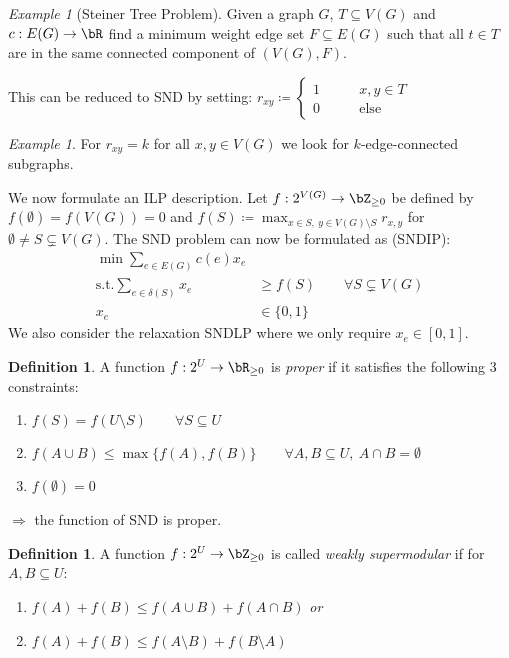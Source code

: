 \documentclass[11pt, a4paper]{article}
\newcommand{\set}[1]{\{#1\}}
\theoremstyle{remark}
\newtheorem{nexample}[theorem]{Example}
\theoremstyle{definition}
\newtheorem{definition}[theorem]{Definition}
\begin{document}
\begin{nexample}[Steiner Tree Problem]
	Given a graph $G$, $T\subseteq V(G)$ and $c: E(G)\to\bR$ find a minimum
	weight edge set $F\subseteq E(G)$ such that all $t\in T$ are in the same
	connected component of $(V(G), F)$.

	This can be reduced to SND by setting: $r_{xy}\coloneqq\begin{cases}
			1 \qquad & x,y\in T    \\
			0 \qquad & \text{else}
		\end{cases}$
\end{nexample}

\begin{nexample}
	For $r_{xy}=k$ for all $x,y\in V(G)$ we look for $k$-edge-connected
	subgraphs.
\end{nexample}

We now formulate an ILP description. Let $f: 2^{V(G)}\to\bZ_{\geq0}$
be defined by $f(\emptyset)=f(V(G))=0$ and $f(S)\coloneqq \max_{x\in
		S,\ y\in V(G) \setminus S}r_{x,y}$ for $\emptyset\neq S\subsetneq
	V(G)$. The SND problem can now be formulated as (SNDIP):
\begin{align*}
	\min\sum_{e\in E(G)}c(e)x_e                                                     \\
	\text{s.t.} \sum_{e\in\delta(S)}x_e & \geq f(S) \qquad \forall S\subsetneq V(G) \\
	x_e                                 & \in\set{0,1}
\end{align*}
We also consider the relaxation SNDLP where we only require $x_e\in[0,1]$.

\begin{definition}
	A function $f: 2^U\to\bR_{\geq0}$ is \emph{proper} if it satisfies the
	following 3 constraints:
	\begin{enumerate}[label=\roman*)]
		\item $f(S)=f(U\setminus S)\qquad \forall S\subseteq U$
		\item $f(A\cup B)\leq\max\set{f(A),f(B)} \qquad \forall A,B\subseteq U,
			\ A\cap B=\emptyset$
		\item $f(\emptyset)=0$
	\end{enumerate}
\end{definition}
$\Rightarrow$ the function of SND is proper.

\begin{definition}
	A function $f: 2^U\to\bZ_{\geq0}$ is called \emph{weakly supermodular}
	if for $A,B\subseteq U$:
	\begin{enumerate}[label=\roman*)]
		\item $f(A)+f(B)\leq f(A\cup B)+f(A\cap B)$ \emph{or}
		\item $f(A)+f(B)\leq f(A\setminus B)+f(B\setminus A)$
	\end{enumerate}
\end{definition}
\end{document}
